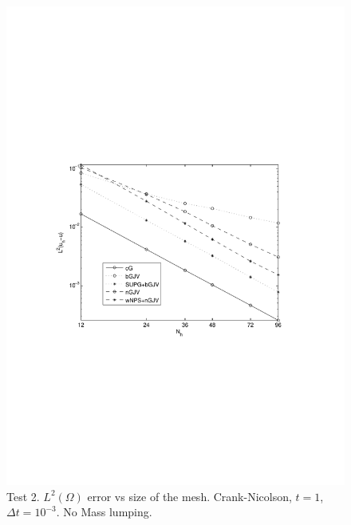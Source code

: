 \begin{figure}
\includegraphics[clip=true, trim=0cm 9cm 0cm 9cm,width=14cm]{Figures/paper1/smooth_conv_test_2D.pdf}%
 \caption{Test 2. $L^2(\Omega)$ error vs size of the mesh. Crank-Nicolson, $t=1$, $\Delta t = 10^{-3}$. No Mass lumping.}\label{fig-smooth_sol}
 \end{figure}



